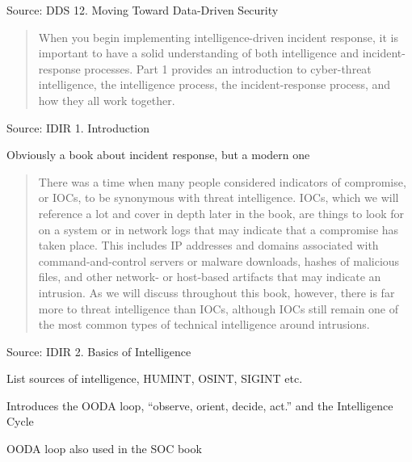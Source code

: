 \documentclass[Screen16to9,17pt]{foils}
\begin{document}
Source: DDS 12. Moving Toward Data-Driven Security







\begin{quote}
When you begin implementing intelligence-driven incident response, it is important to have a solid understanding of both intelligence and incident-response processes. Part 1 provides an introduction to cyber-threat intelligence, the intelligence process, the incident-response process, and how they all work together.
\end{quote}
Source: IDIR 1. Introduction

\begin{list2}
\item Obviously a book about incident response, but a modern one
\end{list2}



\begin{quote}
There was a time when many people considered indicators of compromise, or IOCs, to be synonymous with threat intelligence. IOCs, which we will reference a lot and cover in depth later in the book, are things to look for on a system or in network logs that may indicate that a compromise has taken place. This includes IP addresses and domains associated with command-and-control servers or malware downloads, hashes of malicious files, and other network- or host-based artifacts that may indicate an intrusion. As we will discuss throughout this book, however, there is far more to threat intelligence than IOCs, although IOCs still remain one of the most common types of technical intelligence around intrusions.
\end{quote}
Source:  IDIR 2. Basics of Intelligence

\begin{list2}
\item List sources of intelligence, HUMINT, OSINT, SIGINT etc.
\item Introduces the OODA loop, “observe, orient, decide, act.” and the Intelligence Cycle
\item OODA loop also used in the SOC book
\end{list2}

\slide{}
\end{document}
